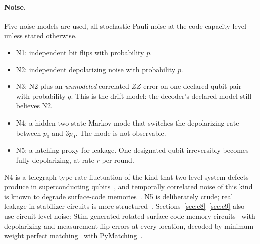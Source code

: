 \paragraph{Noise.} Five noise models are used, all stochastic Pauli noise at the code-capacity level unless stated otherwise.
\begin{itemize}[nosep]
\item N1: independent bit flips with probability $p$.
\item N2: independent depolarizing noise with probability $p$.
\item N3: N2 plus an \emph{unmodeled} correlated $ZZ$ error on one declared qubit pair with probability $q$. This is the drift model: the decoder's declared model still believes N2.
\item N4: a hidden two-state Markov mode that switches the depolarizing rate between $p_0$ and $3p_0$. The mode is not observable.
\item N5: a latching proxy for leakage. One designated qubit irreversibly becomes fully depolarizing, at rate $r$ per round.
\end{itemize}
N4 is a telegraph-type rate fluctuation of the kind that two-level-system defects produce in superconducting qubits~\cite{klimov2018fluctuations}, and temporally correlated noise of this kind is known to degrade surface-code memories~\cite{kam2025nonmarkovian}. N5 is deliberately crude; real leakage in stabilizer circuits is more structured~\cite{ghosh2013leakage,mcewen2021removing}. Sections~\ref{sec:e8}--\ref{sec:e9} also use circuit-level noise: Stim-generated rotated-surface-code memory circuits~\cite{gidney2021stim} with depolarizing and measurement-flip errors at every location, decoded by minimum-weight perfect matching~\cite{dennis2002topological,edmonds1965blossom} with PyMatching~\cite{higgott2022pymatching,higgott2025sparseblossom}.


